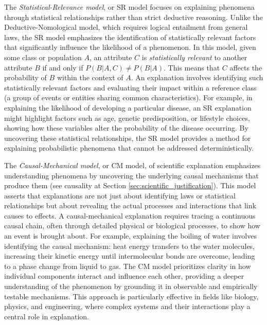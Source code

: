 The \emph{Statistical-Relevance model}, or SR model focuses on explaining phenomena through statistical relationships rather than strict deductive reasoning. Unlike the Deductive-Nomological model, which requires logical entailment from general laws, the SR model emphasizes the identification of statistically relevant factors that significantly influence the likelihood of a phenomenon. In this model, given some class or population \( A \), an attribute \( C \) is \emph{statistically relevant} to another attribute \( B \) if and only if \( P(B | A, C) \neq P(B | A) \). This means that \( C \) affects the probability of \( B \) within the context of \( A \). An explanation involves identifying such statistically relevant factors and evaluating their impact within a reference class (a group of events or entities sharing common characteristics). For example, in explaining the likelihood of developing a particular disease, an SR explanation might highlight factors such as age, genetic predisposition, or lifestyle choices, showing how these variables alter the probability of the disease occurring. By uncovering these statistical relationships, the SR model provides a method for explaining probabilistic phenomena that cannot be addressed deterministically.

The \emph{Causal-Mechanical model}, or CM model, of scientific explanation emphasizes understanding phenomena by uncovering the underlying causal mechanisms that produce them (see causality at Section \ref{sec:scientific_justification}). This model asserts that explanations are not just about identifying laws or statistical relationships but about revealing the actual processes and interactions that link causes to effects. A causal-mechanical explanation requires tracing a continuous causal chain, often through detailed physical or biological processes, to show how an event is brought about. For example, explaining the boiling of water involves identifying the causal mechanism: heat energy transfers to the water molecules, increasing their kinetic energy until intermolecular bonds are overcome, leading to a phase change from liquid to gas. The CM model prioritizes clarity in how individual components interact and influence each other, providing a deeper understanding of the phenomenon by grounding it in observable and empirically testable mechanisms. This approach is particularly effective in fields like biology, physics, and engineering, where complex systems and their interactions play a central role in explanation.

